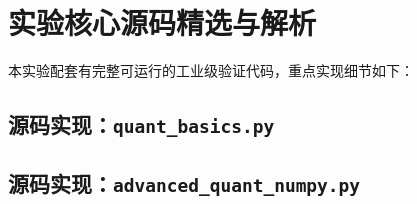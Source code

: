 \section{实验核心源码精选与解析}

本实验配套有完整可运行的工业级验证代码，重点实现细节如下：


\subsection{源码实现：\texttt{quant\_basics.py}}




\subsection{源码实现：\texttt{advanced\_quant\_numpy.py}}



